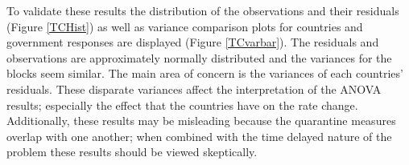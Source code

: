 To validate these results the distribution of the observations and their residuals (Figure \ref{TCHist}) as well as variance comparison plots for countries and government responses are displayed (Figure \ref{TCvarbar}). The residuals and observations are approximately normally distributed and the variances for the blocks seem similar. The main area of concern is the variances of each countries' residuals. These disparate variances affect the interpretation of the ANOVA results; especially the effect that the countries have on the rate change. Additionally, these results may be misleading because the quarantine measures overlap with one another; when combined with the time delayed nature of the problem these results should be viewed skeptically. 



